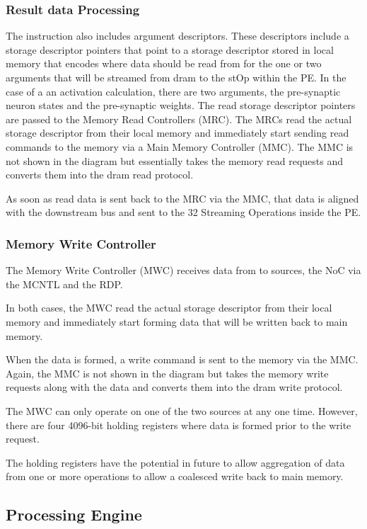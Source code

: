 \documentclass[journal]{IEEEtran}
\begin{document}
\subsubsection{Result data Processing}
\label{ssec:resultDataprocessing}
The instruction also includes argument descriptors. These descriptors include a storage descriptor pointers that point to a storage descriptor stored in local memory that encodes where data should be read from for the one or two arguments that will be streamed from \ac{dram} to the stOp within the PE. In the case of a \ac{an} activation calculation, there are two arguments, the pre-synaptic neuron states and the pre-synaptic weights. The read storage descriptor pointers are passed to the Memory Read Controllers (MRC). The MRCs read the actual storage descriptor from their local memory and immediately start sending read commands to the memory via a Main Memory Controller (MMC). The MMC is not shown in the diagram but essentially takes the memory read requests and converts them into the \ac{dram} read protocol.

As soon as read data is sent back to the MRC via the MMC, that data is aligned with the downstream bus and sent to the 32 Streaming Operations inside the PE.


\subsubsection{Memory Write Controller}
\label{ssec:memoryWriteController}

The Memory Write Controller (MWC) receives data from to sources, the NoC via the MCNTL and the RDP.

In both cases, the MWC read the actual storage descriptor from their local memory and immediately start forming data that will be written back to main memory.

When the data is formed, a write command is sent to the memory via the MMC. Again, the MMC is not shown in the diagram but takes the memory write requests along with the data and converts them into the \ac{dram} write protocol.

The MWC can only operate on one of the two sources at any one time. However, there are four 4096-bit holding registers where data is formed prior to the write request.

The holding registers have the potential in future to allow aggregation of data from one or more operations to allow a coalesced write back to main memory.


\subsection{Processing Engine}
\label{sec:pe}
\end{document}
